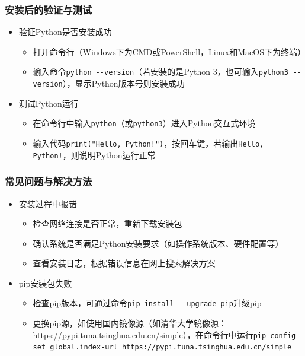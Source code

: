 \begin{frame}[fragile]
    \frametitle{安装后的验证与测试}
    \begin{itemize}
        \item 验证Python是否安装成功
            \begin{itemize}
                \item 打开命令行（Windows下为CMD或PowerShell，Linux和MacOS下为终端）
                \item 输入命令\verb|python --version|（若安装的是Python 3，也可输入\verb|python3 --version|），显示Python版本号则安装成功
            \end{itemize}
        \item 测试Python运行
            \begin{itemize}
                \item 在命令行中输入\verb|python|（或\verb|python3|）进入Python交互式环境
                \item 输入代码\verb|print("Hello, Python!")|，按回车键，若输出\verb|Hello, Python!|，则说明Python运行正常
            \end{itemize}
    \end{itemize}
\end{frame}

\begin{frame}[fragile]
    \frametitle{常见问题与解决方法}
    \begin{itemize}
        \item 安装过程中报错
            \begin{itemize}
                \item 检查网络连接是否正常，重新下载安装包
                \item 确认系统是否满足Python安装要求（如操作系统版本、硬件配置等）
                \item 查看安装日志，根据错误信息在网上搜索解决方案
            \end{itemize}
        \item pip安装包失败
            \begin{itemize}
                \item 检查pip版本，可通过命令\verb|pip install --upgrade pip|升级pip
                \item 更换pip源，如使用国内镜像源（如清华大学镜像源：\href{https://pypi.tuna.tsinghua.edu.cn/simple}{https://pypi.tuna.tsinghua.edu.cn/simple}），在命令行中运行\verb|pip config set global.index-url https://pypi.tuna.tsinghua.edu.cn/simple|
            \end{itemize}
    \end{itemize}
\end{frame}

